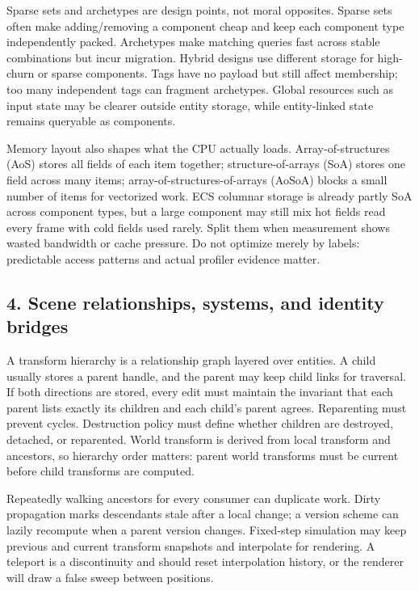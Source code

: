 Sparse sets and archetypes are design points, not moral opposites. Sparse sets often make adding/removing a component cheap and keep each component type independently packed. Archetypes make matching queries fast across stable combinations but incur migration. Hybrid designs use different storage for high-churn or sparse components. Tags have no payload but still affect membership; too many independent tags can fragment archetypes. Global resources such as input state may be clearer outside entity storage, while entity-linked state remains queryable as components.

Memory layout also shapes what the CPU actually loads. Array-of-structures (AoS) stores all fields of each item together; structure-of-arrays (SoA) stores one field across many items; array-of-structures-of-arrays (AoSoA) blocks a small number of items for vectorized work. ECS columnar storage is already partly SoA across component types, but a large component may still mix hot fields read every frame with cold fields used rarely. Split them when measurement shows wasted bandwidth or cache pressure. Do not optimize merely by labels: predictable access patterns and actual profiler evidence matter.

\subsection{4. Scene relationships, systems, and identity bridges}\label{05-engine-i-ch008-scene-relationships-systems-and-identity-bridges}

\hypertarget{05-engine-i-ch008-scene-relationships-systems-and-identity-bridges}{}

A transform hierarchy is a relationship graph layered over entities. A child usually stores a parent handle, and the parent may keep child links for traversal. If both directions are stored, every edit must maintain the invariant that each parent lists exactly its children and each child's parent agrees. Reparenting must prevent cycles. Destruction policy must define whether children are destroyed, detached, or reparented. World transform is derived from local transform and ancestors, so hierarchy order matters: parent world transforms must be current before child transforms are computed.

Repeatedly walking ancestors for every consumer can duplicate work. Dirty propagation marks descendants stale after a local change; a version scheme can lazily recompute when a parent version changes. Fixed-step simulation may keep previous and current transform snapshots and interpolate for rendering. A teleport is a discontinuity and should reset interpolation history, or the renderer will draw a false sweep between positions.

